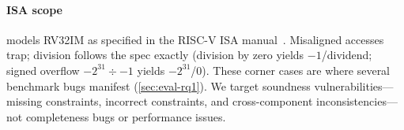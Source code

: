 \paragraph{ISA scope}
\tool models RV32IM as specified in the RISC-V ISA manual~\cite{riscvspec}. Misaligned accesses trap; division follows the spec exactly (division by zero yields $-1$/dividend; signed overflow $-2^{31} \div -1$ yields $-2^{31}$/$0$). These corner cases are where several benchmark bugs manifest (\autoref{sec:eval-rq1}). We target soundness vulnerabilities---missing constraints, incorrect constraints, and cross-component inconsistencies---not completeness bugs or performance issues.
